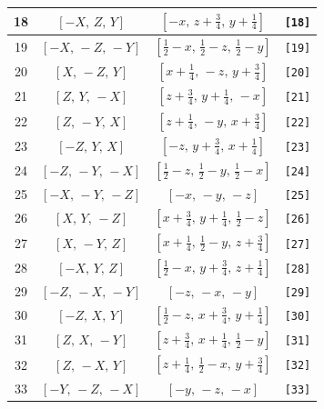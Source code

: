 \documentclass[fleqn,8pt]{jsarticle}
\begin{document}
\begin{longtable}{cccc}
18 & $\left[ - X,\, Z,\, Y \right]$ & $\left[ - x,\, z + \frac{3}{4},\, y + \frac{1}{4} \right]$ & {\tt [18]} \\ \hline
19 & $\left[ - X,\, - Z,\, - Y \right]$ & $\left[ \frac{1}{2} - x,\, \frac{1}{2} - z,\, \frac{1}{2} - y \right]$ & {\tt [19]} \\ \hline
20 & $\left[ X,\, - Z,\, Y \right]$ & $\left[ x + \frac{1}{4},\, - z,\, y + \frac{3}{4} \right]$ & {\tt [20]} \\ \hline
21 & $\left[ Z,\, Y,\, - X \right]$ & $\left[ z + \frac{3}{4},\, y + \frac{1}{4},\, - x \right]$ & {\tt [21]} \\ \hline
22 & $\left[ Z,\, - Y,\, X \right]$ & $\left[ z + \frac{1}{4},\, - y,\, x + \frac{3}{4} \right]$ & {\tt [22]} \\ \hline
23 & $\left[ - Z,\, Y,\, X \right]$ & $\left[ - z,\, y + \frac{3}{4},\, x + \frac{1}{4} \right]$ & {\tt [23]} \\ \hline
24 & $\left[ - Z,\, - Y,\, - X \right]$ & $\left[ \frac{1}{2} - z,\, \frac{1}{2} - y,\, \frac{1}{2} - x \right]$ & {\tt [24]} \\ \hline
25 & $\left[ - X,\, - Y,\, - Z \right]$ & $\left[ - x,\, - y,\, - z \right]$ & {\tt [25]} \\ \hline
26 & $\left[ X,\, Y,\, - Z \right]$ & $\left[ x + \frac{3}{4},\, y + \frac{1}{4},\, \frac{1}{2} - z \right]$ & {\tt [26]} \\ \hline
27 & $\left[ X,\, - Y,\, Z \right]$ & $\left[ x + \frac{1}{4},\, \frac{1}{2} - y,\, z + \frac{3}{4} \right]$ & {\tt [27]} \\ \hline
28 & $\left[ - X,\, Y,\, Z \right]$ & $\left[ \frac{1}{2} - x,\, y + \frac{3}{4},\, z + \frac{1}{4} \right]$ & {\tt [28]} \\ \hline
29 & $\left[ - Z,\, - X,\, - Y \right]$ & $\left[ - z,\, - x,\, - y \right]$ & {\tt [29]} \\ \hline
30 & $\left[ - Z,\, X,\, Y \right]$ & $\left[ \frac{1}{2} - z,\, x + \frac{3}{4},\, y + \frac{1}{4} \right]$ & {\tt [30]} \\ \hline
31 & $\left[ Z,\, X,\, - Y \right]$ & $\left[ z + \frac{3}{4},\, x + \frac{1}{4},\, \frac{1}{2} - y \right]$ & {\tt [31]} \\ \hline
32 & $\left[ Z,\, - X,\, Y \right]$ & $\left[ z + \frac{1}{4},\, \frac{1}{2} - x,\, y + \frac{3}{4} \right]$ & {\tt [32]} \\ \hline
33 & $\left[ - Y,\, - Z,\, - X \right]$ & $\left[ - y,\, - z,\, - x \right]$ & {\tt [33]} \\ \hline

\end{longtable}
\end{document}
